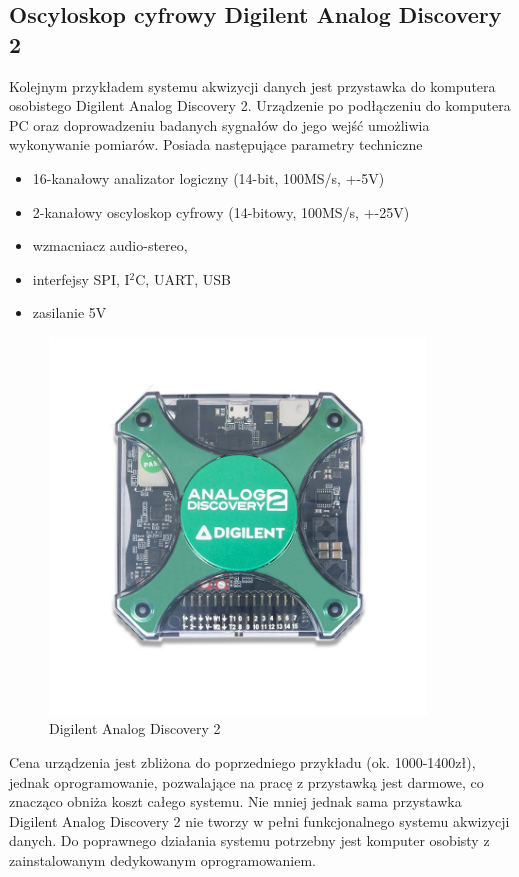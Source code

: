 \subsection{Oscyloskop cyfrowy Digilent Analog Discovery 2}

Kolejnym przykładem systemu akwizycji danych jest przystawka do komputera osobistego  Digilent Analog Discovery 2. Urządzenie po podłączeniu do komputera PC oraz doprowadzeniu badanych sygnałów do jego wejść umożliwia wykonywanie pomiarów. Posiada następujące parametry techniczne\cite{AnalogDiscoveryDoc}

\begin{itemize}
\item 16-kanałowy analizator logiczny (14-bit, 100MS/s, +-5V) 
\item 2-kanałowy oscyloskop cyfrowy (14-bitowy, 100MS/s, +-25V) 
\item wzmacniacz audio-stereo, 
\item interfejsy SPI, I$^2$C, UART, USB
\item zasilanie 5V
\end{itemize}

\begin{figure}[h]
	\centering
		\includegraphics[width=10cm]{analog_discovery2}
	\caption{Digilent Analog Discovery 2} 
	\label{fig:uxtouch}
\end{figure}


Cena urządzenia jest zbliżona do poprzedniego przykładu (ok. 1000-1400zł), jednak oprogramowanie, pozwalające na pracę z przystawką jest darmowe, co znacząco obniża koszt całego systemu. Nie mniej jednak sama przystawka Digilent Analog Discovery 2 nie tworzy w pełni funkcjonalnego systemu akwizycji danych. Do poprawnego działania systemu potrzebny jest komputer osobisty z zainstalowanym dedykowanym oprogramowaniem.

